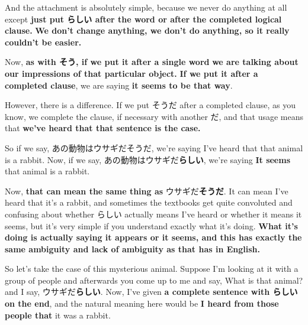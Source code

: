 {}

And the attachment is absolutely simple, because we never do anything at all except {\bf just put らしい after the word or after the completed logical clause.} {\bf We don't change anything, we don't do anything, so it really couldn't be easier.}

{}

Now, {\bf as with そう, if we put it after a single word} {\bf we are talking about our impressions of that particular object.} {\bf If we put it after a completed clause}, we are saying {\bf it seems to be that way}.

\stopsectionlevel

\startsectionlevel[title={Difference between らしい & そうだ/です},reference={difference-between-らしい-そうだです}]

However, there is a difference. If we put そうだ after a completed clause, as you know, we complete the clause, if necessary with another だ, and that usage means that {\bf we've heard that that sentence is the case.}

{}

\startsectionlevel[title={らしい vs そうだ - after a complete clause},reference={らしい-vs-そうだ---after-a-complete-clause}]

So if we say, あの動物はウサギだそうだ, we're saying I've heard that that animal is a rabbit. Now, if we say, あの動物はウサギだ{\bf らしい}, we're saying {\bf It seems} that animal is a rabbit.

{}

Now, {\bf that can mean the same thing as} ウサギだ{\bf そうだ}. It can mean I've heard that it's a rabbit, and sometimes the textbooks get quite convoluted and confusing about whether らしい actually means I've heard or whether it means it seems, but it's very simple if you understand exactly what it's doing. {\bf What it's doing is actually saying it appears or it seems, and this has exactly the same ambiguity and lack of ambiguity as that has in English.}

So let's take the case of this mysterious animal. Suppose I'm looking at it with a group of people and afterwards you come up to me and say, What is that animal? and I say, ウサギだ{\bf らしい}. Now, I've given {\bf a complete sentence with らしい on the end}, and the natural meaning here would be {\bf I heard from those people that} it was a rabbit.

